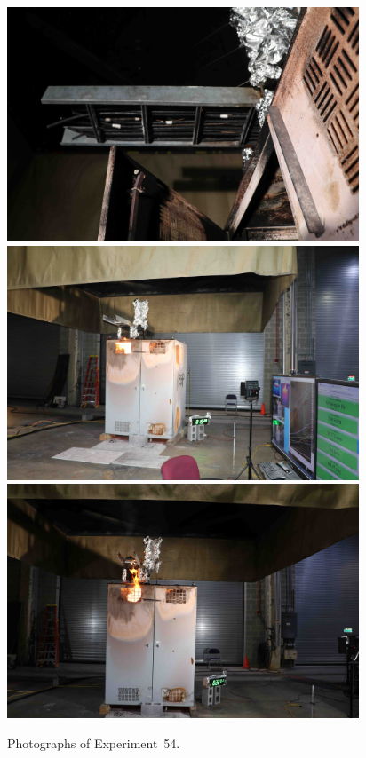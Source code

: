 \documentclass[12pt]{article}
\begin{document}
\begin{figure}[p]
\centering
\includegraphics[height=2.75in]{../FIGURES/Test_54_cables} \\
\includegraphics[height=2.75in]{../FIGURES/Test_54_15_min_20_s} \\
\includegraphics[height=2.75in]{../FIGURES/Test_54_22_min_31_s}
\caption[Photographs of Experiment~54]{Photographs of Experiment~54.}
\label{fig:Test_54_photos}
\end{figure}


\clearpage
\end{document}
